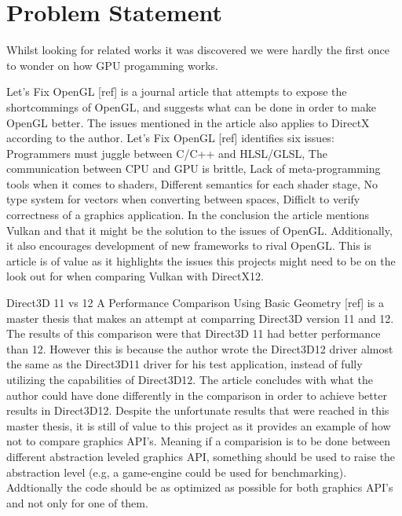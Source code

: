 \section{Problem Statement}\label{sec:problem_statement}
\begin{sectionmeta}
Whilst looking for related works it was discovered we were hardly the first once to wonder on how GPU progamming works.

Let's Fix OpenGL [ref] is a journal article that attempts to expose the shortcommings of OpenGL, and suggests what can be done in order to make OpenGL better. 
The issues mentioned in the article also applies to DirectX according to the author. 
Let's Fix OpenGL [ref] identifies six issues: 
Programmers must juggle between C/C++ and HLSL/GLSL, 
The communication between CPU and GPU is brittle,
Lack of meta-programming tools when it comes to shaders,
Different semantics for each shader stage,
No type system for vectors when converting between spaces,
Difficlt to verify correctness of a graphics application.
In the conclusion the article mentions Vulkan and that it might be the solution to the issues of OpenGL. Additionally, it also encourages development of new frameworks to rival OpenGL.
This is article is of value as it highlights the issues this projects might need to be on the look out for when comparing Vulkan with DirectX12.

Direct3D 11 vs 12 A Performance Comparison Using Basic Geometry [ref] is a master thesis that makes an attempt at comparring Direct3D version 11 and 12. 
The results of this comparison were that Direct3D 11 had better performance than 12. 
However this is because the author wrote the Direct3D12 driver almost the same as the Direct3D11 driver for his test application, instead of fully utilizing the capabilities of Direct3D12. 
The article concludes with what the author could have done differently in the comparison in order to achieve better results in Direct3D12.
Despite the unfortunate results that were reached in this master thesis, it is still of value to this project as it provides an example of how not to compare graphics API's. 
Meaning if a comparision is to be done between different abstraction leveled graphics API, something should be used to raise the abstraction level  (e.g, a game-engine could be used for benchmarking). 
Addtionally the code should be as optimized as possible for both graphics API's and not only for one of them.


\end{sectionmeta}
